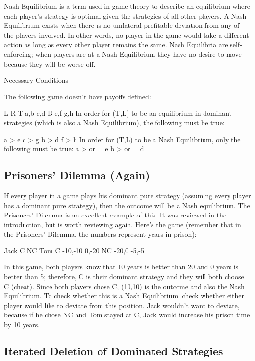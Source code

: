 \documentclass[a4paper,12pt]{article}
\begin{document}
Nash Equilibrium is a term used in game theory to describe an equilibrium where each player's strategy is optimal given the strategies of all other players. A Nash Equilibrium exists when there is no unilateral profitable deviation from any of the players involved. In other words, no player in the game would take a different action as long as every other player remains the same. Nash Equilibria are self-enforcing; when players are at a Nash Equilibrium they have no desire to move because they will be worse off.

Necessary Conditions

The following game doesn't have payoffs defined:

L	R
T	a,b	c,d
B	e,f	g,h
In order for (T,L) to be an equilibrium in dominant strategies (which is also a Nash Equilibrium), the following must be true:

a > e
c > g
b > d
f > h
In order for (T,L) to be a Nash Equilibrium, only the following must be true:
a > or = e
b > or = d
\subsection{Prisoners' Dilemma (Again)}

If every player in a game plays his dominant pure strategy (assuming every player has a dominant pure strategy), then the outcome will be a Nash equilibrium. The Prisoners' Dilemma is an excellent example of this. It was reviewed in the introduction, but is worth reviewing again. Here's the game (remember that in the Prisoners' Dilemma, the numbers represent years in prison):

Jack
C	NC
Tom	C	-10,-10	0,-20
NC	-20,0	-5,-5

In this game, both players know that 10 years is better than 20 and 0 years is better than 5; therefore, C is their dominant strategy and they will both choose C (cheat). Since both players chose C, (10,10) is the outcome and also the Nash Equilibrium. To check whether this is a Nash Equilibrium, check whether either player would like to deviate from this position. Jack wouldn't want to deviate, because if he chose NC and Tom stayed at C, Jack would increase his prison time by 10 years.

\subsection{Iterated Deletion of Dominated Strategies}
\end{document}
